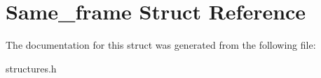 \hypertarget{structSame__frame}{}\section{Same\+\_\+frame Struct Reference}
\label{structSame__frame}


The documentation for this struct was generated from the following file\+:\begin{DoxyCompactItemize}
\item 
structures.\+h\end{DoxyCompactItemize}
